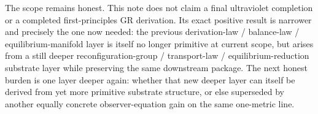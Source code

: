 \documentclass[11pt]{article}
\begin{document}
The scope remains honest. This note does not claim a final ultraviolet completion or a completed first-principles GR derivation. Its exact positive result is narrower and precisely the one now needed: the previous derivation-law / balance-law / equilibrium-manifold layer is itself no longer primitive at current scope, but arises from a still deeper reconfiguration-group / transport-law / equilibrium-reduction substrate layer while preserving the same downstream package. The next honest burden is one layer deeper again: whether that new deeper layer can itself be derived from yet more primitive substrate structure, or else superseded by another equally concrete observer-equation gain on the same one-metric line.
\end{document}
